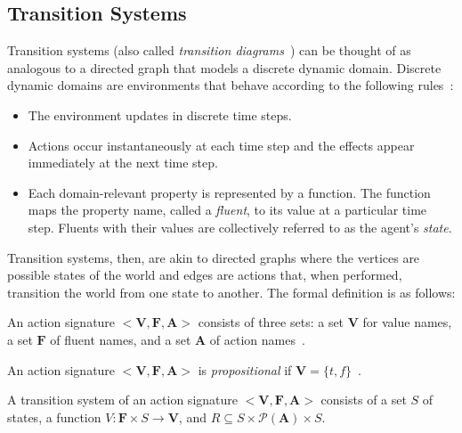\subsection{Transition Systems}
\label{subsec:transition_systems}

Transition systems (also called \textit{transition diagrams}~\citep{blount_architecture_2013}) can be thought of as analogous to a directed graph that models a discrete dynamic domain.
Discrete dynamic domains are environments that behave according to the following rules~\citep{blount_architecture_2013}:

\begin{itemize}
    \item The environment updates in discrete time steps.
    \item Actions occur instantaneously at each time step and the effects appear immediately at the next time step.
    \item Each domain-relevant property is represented by a function.
        The function maps the property name, called a \textit{fluent}, to its value at a particular time step.
        Fluents with their values are collectively referred to as the agent's \textit{state}.
\end{itemize}

Transition systems, then, are akin to directed graphs where the vertices are possible states of the world and edges are actions that, when performed, transition the world from one state to another.
The formal definition is as follows:

\begin{definition}
    \label{def:action_signature}
    An action signature $ < \boldsymbol{V}, \boldsymbol{F}, \boldsymbol{A}> $ consists of three sets: a set $ \boldsymbol{V} $ for value names, a set $ \boldsymbol{F} $ of fluent names, and a set $ \boldsymbol{A} $ of action names~\citep{gelfond_action_1998}.
\end{definition}

\begin{definition}
    \label{def:propositional_action_signature}
    An action signature $< \boldsymbol{V}, \boldsymbol{F}, \boldsymbol{A}>$ is \textit{propositional} if $\boldsymbol{V}=\{t,f\}$~\citep{gelfond_action_1998}.
\end{definition}

\begin{definition}
    \label{def:transition_system}
    A transition system of an action signature $ < \boldsymbol{V}, \boldsymbol{F}, \boldsymbol{A}> $ consists of a set $ S $ of states, a function $ V : \boldsymbol{F} \times S\rightarrow \boldsymbol{V} $, and $ R \subseteq S \times \mathcal{P}(\boldsymbol{A}) \times S $.
\end{definition}

